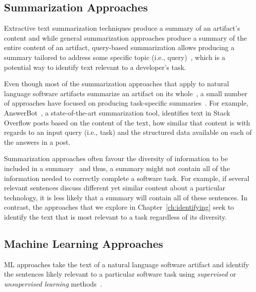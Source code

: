 \subsection{Summarization Approaches}
\label{cp2:summarization}



Extractive text summarization techniques 
produce a summary of an artifact's content
and while general summarization approaches produce a summary of the entire content of an artifact, 
query-based summarization allows 
producing a summary tailored to address some specific topic (i.e., query)~\cite{Goldsteinet1999}, which is a potential way to identify 
text relevant to a developer's task. 


Even though most of the summarization approaches that apply to natural language software artifacts 
summarize an artifact on its whole~\cite{Rastkar2010, Murray2008, Lotufo2012, Ponzanelli2015},
a small number of approaches have focused on
producing task-specific summaries~\cite{Xu2017, silva2019}.
For example, 
 AnswerBot~\cite{Xu2017},
 a state-of-the-art summarization tool, 
identifies text
in Stack Overflow posts 
based on 
the content of the text, how similar that content is with regards to an input query (i.e., task)
and the structured data available on each of the answers in a post.



Summarization approaches often favour the diversity of information to be included in a summary~\cite{Carbonell1998,li2018deep}
and thus, a summary might not contain all of the information needed 
to correctly complete a software task.
For example, if several relevant sentences discuss different yet similar content about 
a particular technology, it is less likely that a summary will contain all of these sentences. 
In contrast, the approaches that we explore in Chapter~\ref{ch:identifying}
seek to identify the text that is most relevant to a task regardless 
of its diversity.






\subsection{Machine Learning Approaches}
\label{cp2:machine-learning}


\acf{ML} approaches take the text of a natural language software artifact and identify 
the sentences likely relevant to a particular software task using \textit{supervised} or 
\textit{unsupervised learning} methods~\cite{zhang2005machine}.



